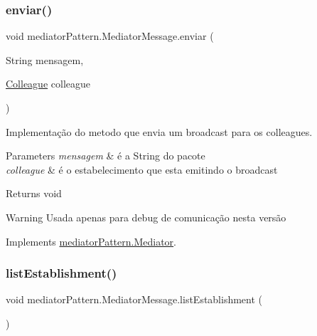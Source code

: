 \subsubsection{\texorpdfstring{enviar()}{enviar()}}
{\footnotesize\ttfamily void mediator\+Pattern.\+Mediator\+Message.\+enviar (\begin{DoxyParamCaption}\item[{String}]{mensagem,  }\item[{\mbox{\hyperlink{classmediator_pattern_1_1_colleague}{Colleague}}}]{colleague }\end{DoxyParamCaption})}



Implementação do metodo que envia um broadcast para os colleagues. 


\begin{DoxyParams}{Parameters}
{\em mensagem} & é a String do pacote \\
\hline
{\em colleague} & é o estabelecimento que esta emitindo o broadcast \\
\hline
\end{DoxyParams}
\begin{DoxyReturn}{Returns}
void 
\end{DoxyReturn}
\begin{DoxyWarning}{Warning}
Usada apenas para debug de comunicação nesta versão 
\end{DoxyWarning}


Implements \mbox{\hyperlink{interfacemediator_pattern_1_1_mediator_aa65168a13dac30a0e6becf57997b5cb8}{mediator\+Pattern.\+Mediator}}.

\mbox{\label{classmediator_pattern_1_1_mediator_message_ad6d32392f6443c3024ef6917ba5abd86}} 
\subsubsection{\texorpdfstring{listEstablishment()}{listEstablishment()}}
{\footnotesize\ttfamily void mediator\+Pattern.\+Mediator\+Message.\+list\+Establishment (\begin{DoxyParamCaption}{ }\end{DoxyParamCaption})}



